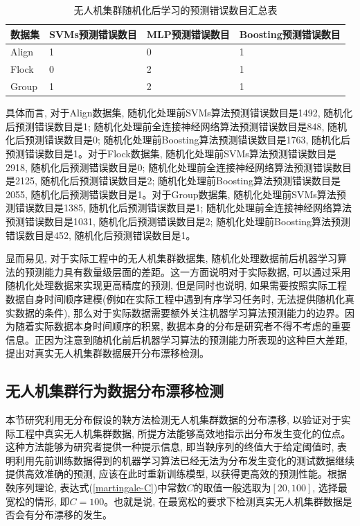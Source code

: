 \begin{table}[]
\centering
\caption{无人机集群随机化后学习的预测错误数目汇总表}
\label{tab:offline}
\begin{tabular}{@{}llll@{}}
\toprule
数据集   & SVMs预测错误数目 & MLP预测错误数目 & Boosting预测错误数目 \\ \midrule
Align & 1          & 0         & 1              \\
Flock & 0          & 2         & 1              \\
Group & 1          & 2         & 1              \\ \bottomrule
\end{tabular}%
\end{table}


具体而言, 对于Align数据集, 随机化处理前SVMs算法预测错误数目是1492, 随机化后预测错误数目是1; 随机化处理前全连接神经网络算法预测错误数目是848, 随机化后预测错误数目是0; 随机化处理前Boosting算法预测错误数目是1763, 随机化后预测错误数目是1。对于Flock数据集, 随机化处理前SVMs算法预测错误数目是2918, 随机化后预测错误数目是0; 随机化处理前全连接神经网络算法预测错误数目是2125, 随机化后预测错误数目是2; 随机化处理前Boosting算法预测错误数目是2055, 随机化后预测错误数目是1。对于Group数据集, 随机化处理前SVMs算法预测错误数目是1385, 随机化后预测错误数目是1; 随机化处理前全连接神经网络算法预测错误数目是1031, 随机化后预测错误数目是2; 随机化处理前Boosting算法预测错误数目是452, 随机化后预测错误数目是1。

显而易见, 对于实际工程中的无人机集群数据集, 随机化处理数据前后机器学习算法的预测能力具有数量级层面的差距。这一方面说明对于实际数据, 可以通过采用随机化处理数据来实现更高精度的预测, 但是同时也说明, 如果需要按照实际工程数据自身时间顺序建模(例如在实际工程中遇到有序学习任务时, 无法提供随机化真实数据的条件), 那么对于实际数据需要额外关注机器学习算法预测能力的边界。因为随着实际数据本身时间顺序的积累, 数据本身的分布是研究者不得不考虑的重要信息。正因为注意到随机化前后机器学习算法的预测能力所表现的这种巨大差距, 提出对真实无人机集群数据展开分布漂移检测。

\subsection{无人机集群行为数据分布漂移检测}
本节研究利用无分布假设的鞅方法检测无人机集群数据的分布漂移, 以验证对于实际工程中真实无人机集群数据, 所提方法能够高效地指示出分布发生变化的位点。这种方法能够为研究者提供一种提示信息, 即当鞅序列的终值大于给定阈值时, 表明利用先前训练数据得到的机器学习算法已经无法为分布发生变化的测试数据继续提供高效准确的预测, 应该在此时重新训练模型, 以获得更高效的预测性能。根据鞅序列理论, 表达式(\ref{martingale-C})中常数$C$的取值一般选取为$[20, 100]$, 选择最宽松的情形, 即$C=100$。也就是说, 在最宽松的要求下检测真实无人机集群数据是否会有分布漂移的发生。

